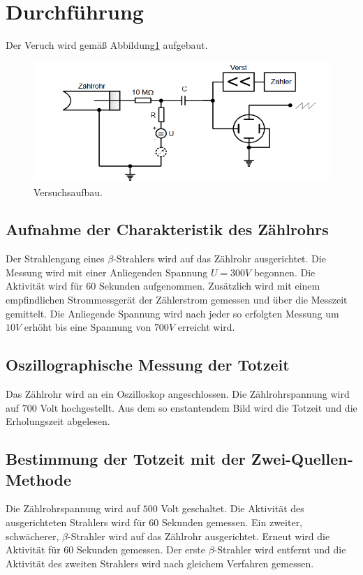 \section{Durchführung}
\label{sec:Durchführung}
Der Veruch wird gemäß Abbildung\ref{fig:aufb} aufgebaut.
\begin{figure}[H]
  \centering
  \includegraphics[scale=0.4]{content/Aufbau.png}
  \caption{Versuchsaufbau.}
  \label{fig:aufb}
\end{figure}

\subsection{Aufnahme der Charakteristik des Zählrohrs}
Der Strahlengang eines $\beta$-Strahlers wird auf das Zählrohr ausgerichtet.
Die Messung wird mit einer Anliegenden Spannung $U= 300 V$ begonnen.
Die Aktivität wird für $60$ Sekunden aufgenommen.
Zusätzlich wird mit einem empfindlichen Strommessgerät der Zählerstrom gemessen und über die Messzeit gemittelt.
Die Anliegende Spannung wird nach jeder so erfolgten Messung um $10 V$ erhöht bis eine Spannung von $700 V$ erreicht wird.
\subsection{Oszillographische Messung der Totzeit}
Das Zählrohr wird an ein Oszilloskop angeschlossen.
Die Zählrohrspannung wird auf $700$ Volt hochgestellt.
Aus dem so enstantendem Bild wird die Totzeit und die Erholungszeit abgelesen.
\subsection{Bestimmung der Totzeit mit der Zwei-Quellen-Methode}
Die Zählrohrspannung wird auf $500$ Volt geschaltet.
Die Aktivität des ausgerichteten Strahlers wird für $60$ Sekunden gemessen.
Ein zweiter, schwächerer, $\beta$-Strahler wird auf  das Zählrohr ausgerichtet.
Erneut wird die Aktivität für $60$ Sekunden gemessen.
Der erste $\beta$-Strahler wird entfernt und die Aktivität des zweiten Strahlers wird nach gleichem Verfahren gemessen.
